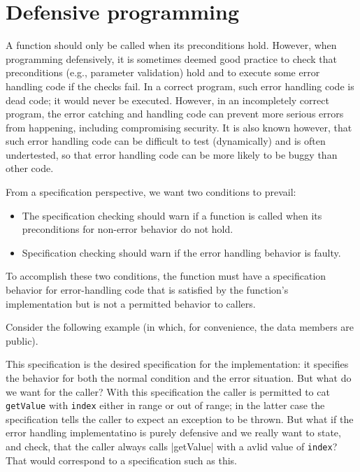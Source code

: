 \section{Defensive programming}
\label{sec:defensive}

A function should only be called when its preconditions 
hold. However, when programming defensively, it is sometimes deemed good practice to check that preconditions (e.g., parameter validation) 
hold and to execute some error handling code if the checks fail. In a correct program, such error handling code is dead code; it would
never be executed. However, in an incompletely correct program, the error catching and handling code can prevent more serious errors
from happening, including compromising security. It is also known however, that such error handling code can be difficult to test (dynamically) and is often undertested, so that error handling code can be more likely to be buggy than other code.\cite{Weimer:2004:FPR:1028976.1029011}

From a specification perspective, we want two conditions to prevail:
\begin{itemize}
	\item The specification checking should warn if a function is called when its preconditions for non-error behavior do not hold.
	\item Specification checking should warn if the error handling behavior is faulty.
\end{itemize}
To accomplish these two conditions, the function must have a specification behavior for error-handling code that is satisfied by the function's implementation but is not a permitted behavior to callers.

Consider the following example (in which, for convenience, the data members are public).



This specification is the desired specification for the implementation: it specifies the behavior for both the normal condition and the error situation.  But what do we want for the caller? With this specification the caller is permitted to cat \lstinline|getValue| with \lstinline|index| either in range or out of range; in the latter case the specification tells the caller to expect an exception to be thrown. But what if the error handling implementatino is purely defensive and we really want to state, and check, that the caller
always calls \stinline|getValue| with a avlid value of \lstinline|index|? That would correspond to a specification such as this.



